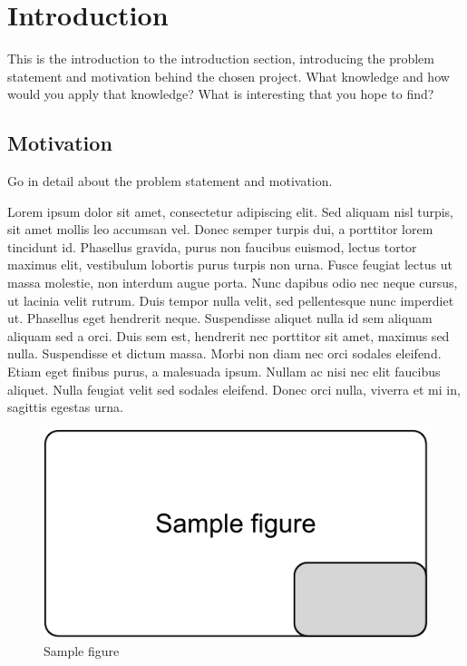 \documentclass[11pt,sigconf]{acmart}
\begin{document}
\maketitle


\section{Introduction}

This is the introduction to the introduction section, introducing the problem statement and motivation behind the chosen project. What knowledge and how would you apply that knowledge? What is interesting that you hope to find?

\subsection{Motivation}

Go in detail about the problem statement and motivation.

Lorem ipsum dolor sit amet, consectetur adipiscing elit.
Sed aliquam nisl turpis, sit amet mollis leo accumsan vel.
Donec semper turpis dui, a porttitor lorem tincidunt id.
Phasellus gravida, purus non faucibus euismod, lectus tortor maximus elit, vestibulum lobortis purus turpis non urna.
Fusce feugiat lectus ut massa molestie, non interdum augue porta.
Nunc dapibus odio nec neque cursus, ut lacinia velit rutrum.
Duis tempor nulla velit, sed pellentesque nunc imperdiet ut.
Phasellus eget hendrerit neque.
Suspendisse aliquet nulla id sem aliquam aliquam sed a orci.
Duis sem est, hendrerit nec porttitor sit amet, maximus sed nulla.
Suspendisse et dictum massa.
Morbi non diam nec orci sodales eleifend.
Etiam eget finibus purus, a malesuada ipsum.
Nullam ac nisi nec elit faucibus aliquet.
Nulla feugiat velit sed sodales eleifend.
Donec orci nulla, viverra et mi in, sagittis egestas urna.

\begin{figure}[htbp]
  \centering
  \includegraphics[scale=0.5]{figure1}
  \caption{Sample figure}
  \label{fig:sample}
\end{figure}
\end{document}
